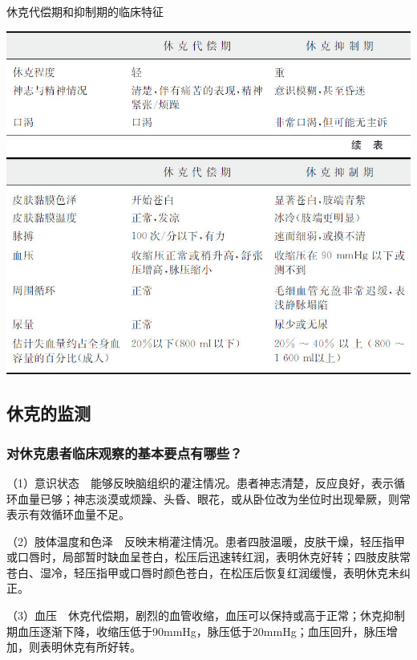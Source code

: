 \begin{table}[htbp]
\centering
\caption{休克代偿期和抑制期的临床特征}
\label{tab2-2}
\includegraphics[width=\textwidth,height=\textheight,keepaspectratio]{./images/Image00014.jpg}
\includegraphics[width=\textwidth,height=\textheight,keepaspectratio]{./images/Image00015.jpg}
\end{table}



\subsection{休克的监测}

\subsubsection{对休克患者临床观察的基本要点有哪些？}

（1）意识状态　能够反映脑组织的灌注情况。患者神志清楚，反应良好，表示循环血量已够；神志淡漠或烦躁、头昏、眼花，或从卧位改为坐位时出现晕厥，则常表示有效循环血量不足。

（2）肢体温度和色泽　反映末梢灌注情况。患者四肢温暖，皮肤干燥，轻压指甲或口唇时，局部暂时缺血呈苍白，松压后迅速转红润，表明休克好转；四肢皮肤常苍白、湿冷，轻压指甲或口唇时颜色苍白，在松压后恢复红润缓慢，表明休克未纠正。

（3）血压　休克代偿期，剧烈的血管收缩，血压可以保持或高于正常；休克抑制期血压逐渐下降，收缩压低于90mmHg，脉压低于20mmHg；血压回升，脉压增加，则表明休克有所好转。

